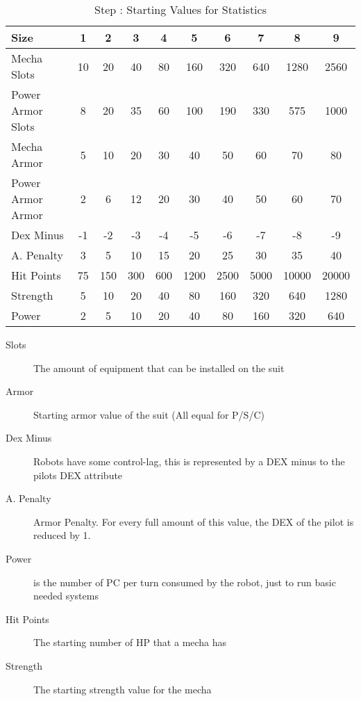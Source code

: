 \begin{table}[htb]
\begin{center}
\begin{tabular}{lc|c|c|c|c|c|c|c|c}
\hline
\textbf{Size} & 1 & 2 & 3 & 4 & 5 & 6 & 7 & 8 & 9 \\
\hline
\hline
Mecha Slots & 10 & 20 & 40 & 80 & 160 & 320 & 640 & 1280 & 2560 \\ \hline
Power Armor Slots & 8 & 20 & 35 & 60 & 100 & 190 & 330 & 575 & 1000 \\ \hline
Mecha Armor & 5 & 10 & 20 & 30 & 40 & 50 & 60 & 70 & 80 \\ \hline
Power Armor Armor & 2 & 6 & 12 & 20 & 30 & 40 & 50 & 60 & 70 \\ \hline
Dex Minus & -1 & -2 & -3 & -4 & -5 & -6 & -7 & -8 & -9 \\ \hline
A. Penalty & 3 & 5 & 10 & 15 & 20 & 25 & 30 & 35 & 40 \\ \hline
Hit Points & 75 & 150 & 300 & 600 & 1200 & 2500 & 5000 & 10000 & 20000 \\ \hline
Strength & 5 & 10 & 20 & 40 & 80 & 160 & 320 & 640 & 1280 \\ \hline
Power & 2 & 5 & 10 & 20 & 40 & 80 & 160 & 320 & 640 \\
\hline
\end{tabular}
\caption{Step : Starting Values for Statistics}
\end{center}
\end{table}
\addtocounter{MechaSteps}{1}

\begin{description}
\item[Slots] The amount of equipment that can be installed on the suit
\item[Armor] Starting armor value of the suit (All equal for P/S/C)
\item[Dex Minus] Robots have some control-lag, this is represented by a DEX minus to the pilots DEX attribute
\item[A. Penalty] Armor Penalty.  For every full amount of this value, the DEX of the pilot is reduced by 1.
\item[Power] is the number of PC per turn consumed by the robot, just to run basic needed systems
\item[Hit Points] The starting number of HP that a mecha has
\item[Strength] The starting strength value for the mecha
\end{description}

